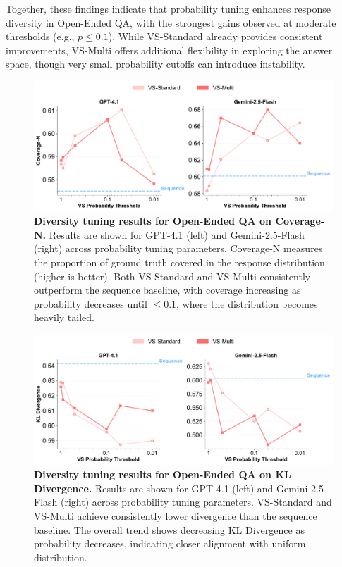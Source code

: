 Together, these findings indicate that probability tuning enhances response diversity in Open-Ended QA, with the strongest gains observed at moderate thresholds (e.g., $p \leq 0.1$). While VS-Standard already provides consistent improvements, VS-Multi offers additional flexibility in exploring the answer space, though very small probability cutoffs can introduce instability.

\begin{figure}[h]
    \centering
    \includegraphics[width=\linewidth]{figures/ablation/bias_metrics_tuning_coverage_n.pdf}
    \caption{\textbf{Diversity tuning results for Open-Ended QA on Coverage-N.} Results are shown for GPT-4.1 (left) and Gemini-2.5-Flash (right) across probability tuning parameters. Coverage-N measures the proportion of ground truth covered in the response distribution (higher is better). Both VS-Standard and VS-Multi consistently outperform the sequence baseline, with coverage increasing as probability decreases until $\leq 0.1$, where the distribution becomes heavily tailed.
    }
    \label{fig:diversity_tuning_coverage_n}
\end{figure}

\begin{figure}[h]
    \centering
    \includegraphics[width=\linewidth]{figures/ablation/bias_metrics_tuning_kl_divergence.pdf}
    \caption{\textbf{Diversity tuning results for Open-Ended QA on KL Divergence.} Results are shown for GPT-4.1 (left) and Gemini-2.5-Flash (right) across probability tuning parameters. VS-Standard and VS-Multi achieve consistently lower divergence than the sequence baseline. The overall trend shows decreasing KL Divergence as probability decreases, indicating closer alignment with uniform distribution.
    }
    \label{fig:diversity_tuning_kl_divergence}
\end{figure}